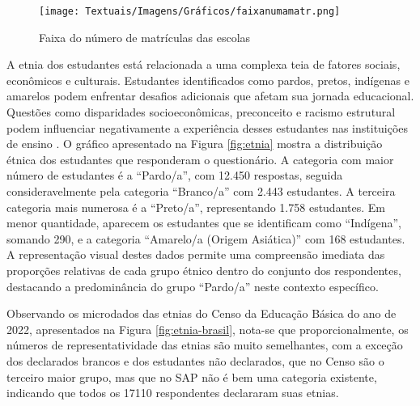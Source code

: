 \begin{figure}[ht!]
    \centering
    \caption{Faixa do número de matrículas das escolas}
    \texttt{[image: Textuais/Imagens/Gráficos/faixanumamatr.png]}
    \label{fig:faixa_num}
\end{figure}

A etnia dos estudantes está relacionada a uma complexa teia de fatores sociais, econômicos e culturais. Estudantes identificados como pardos, pretos, indígenas e amarelos podem enfrentar desafios adicionais que afetam sua jornada educacional. Questões como disparidades socioeconômicas, preconceito e racismo estrutural podem influenciar negativamente a experiência desses estudantes nas instituições de ensino \cite{heringer2018democratizaccao}. O gráfico apresentado na Figura \ref{fig:etnia} mostra a distribuição étnica dos estudantes que responderam o questionário. A categoria com maior número de estudantes é a ``Pardo/a'', com 12.450 respostas, seguida consideravelmente pela categoria ``Branco/a'' com 2.443 estudantes. A terceira categoria mais numerosa é a ``Preto/a'', representando 1.758 estudantes. Em menor quantidade, aparecem os estudantes que se identificam como ``Indígena'', somando 290, e a categoria ``Amarelo/a (Origem Asiática)'' com 168 estudantes. A representação visual destes dados permite uma compreensão imediata das proporções relativas de cada grupo étnico dentro do conjunto dos respondentes, destacando a predominância do grupo ``Pardo/a'' neste contexto específico.

Observando os microdados das etnias do Censo da Educação Básica do ano de 2022, apresentados na Figura \ref{fig:etnia-brasil}, nota-se que proporcionalmente, os números de representatividade das etnias são muito semelhantes, com a exceção dos declarados brancos e dos estudantes não declarados, que no Censo são o terceiro maior grupo, mas que no SAP não é bem uma categoria existente, indicando que todos os 17110 respondentes declararam suas etnias.



